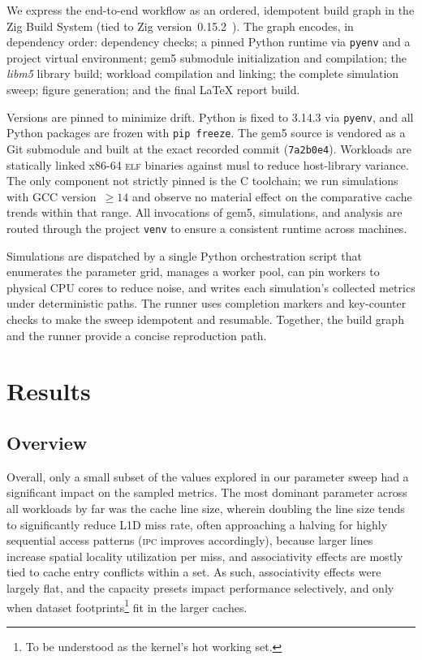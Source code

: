 \documentclass[conference]{IEEEtran}
\begin{document}
We express the end-to-end workflow as an ordered, idempotent build graph in the
Zig Build System (tied to Zig version~0.15.2~\cite{zig:2024}). The graph
encodes, in dependency order: dependency checks; a pinned Python runtime via
\texttt{pyenv} and a project virtual environment; gem5 submodule initialization
and compilation; the \textit{libm5} library build; workload compilation and
linking; the complete simulation sweep; figure generation; and the final
\LaTeX{} report build.

Versions are pinned to minimize drift. Python is fixed to 3.14.3 via
\texttt{pyenv}, and all Python packages are frozen with \texttt{pip~freeze}.
The gem5 source is vendored as a Git submodule and built at the exact recorded
commit (\texttt{7a2b0e4}). Workloads are statically linked x86-64 \textsc{elf}
binaries against musl to reduce host-library variance. The only component not
strictly pinned is the C toolchain; we run simulations with GCC version~\(\geq
14\) and observe no material effect on the comparative cache trends within that
range. All invocations of gem5, simulations, and analysis are routed through
the project \texttt{venv} to ensure a consistent runtime across machines.

Simulations are dispatched by a single Python orchestration script that
enumerates the parameter grid, manages a worker pool, can pin workers to
physical CPU cores to reduce noise, and writes each simulation's collected
metrics under deterministic paths. The runner uses completion markers and
key-counter checks to make the sweep idempotent and resumable. Together, the
build graph and the runner provide a concise reproduction path.

\section{Results}
\subsection{Overview}

Overall, only a small subset of the values explored in our parameter sweep had
a significant impact on the sampled metrics. The most dominant parameter across
all workloads by far was the cache line size, wherein doubling the line size
tends to significantly reduce L1D miss rate, often approaching a halving for
highly sequential access patterns (\textsc{ipc} improves accordingly), because
larger lines increase spatial locality utilization per miss, and associativity
effects are mostly tied to cache entry conflicts within a set. As such,
associativity effects were largely flat, and the capacity presets impact
performance selectively, and only when dataset footprints\footnote{To be
understood as the kernel's hot working set.} fit in the larger caches.
\end{document}
